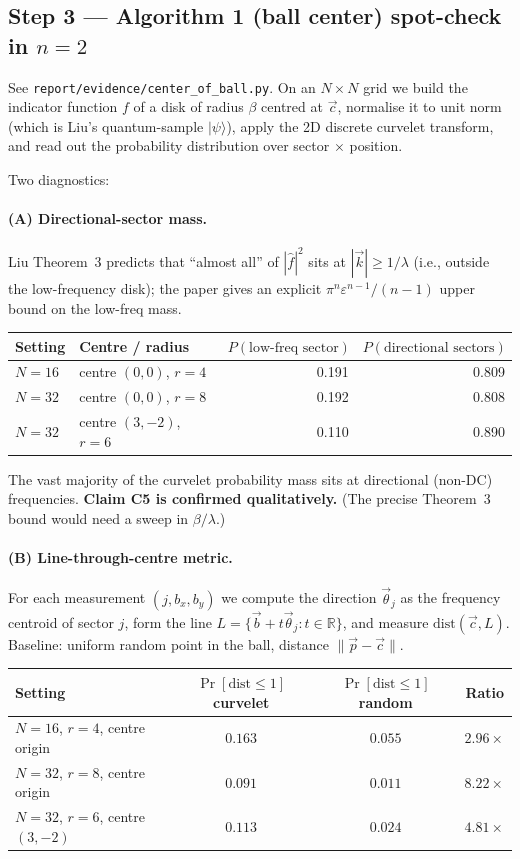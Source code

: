 \documentclass[11pt]{article}
\begin{document}
\subsection{Step 3 --- Algorithm 1 (ball center) spot-check in $n=2$}
See \texttt{report/evidence/center\_of\_ball.py}. On an $N \times N$ grid we build the indicator function $f$ of a disk of radius $\beta$ centred at $\vec c$, normalise it to unit norm (which is Liu's quantum-sample $|\psi\rangle$), apply the 2D discrete curvelet transform, and read out the probability distribution over sector $\times$ position.

Two diagnostics:
\paragraph{(A) Directional-sector mass.} Liu Theorem~3 predicts that ``almost all'' of $|\hat f|^2$ sits at $|\vec k| \geq 1/\lambda$ (i.e., outside the low-frequency disk); the paper gives an explicit $\pi^n \varepsilon^{n-1}/(n-1)$ upper bound on the low-freq mass.
\begin{center}
\begin{tabular}{llrr}
\toprule
Setting & Centre / radius & $P(\text{low-freq sector})$ & $P(\text{directional sectors})$ \\
\midrule
$N=16$ & centre $(0,0)$, $r=4$    & 0.191 & 0.809 \\
$N=32$ & centre $(0,0)$, $r=8$    & 0.192 & 0.808 \\
$N=32$ & centre $(3,-2)$, $r=6$   & 0.110 & 0.890 \\
\bottomrule
\end{tabular}
\end{center}
The vast majority of the curvelet probability mass sits at directional (non-DC) frequencies. \textbf{Claim C5 is confirmed qualitatively.} (The precise Theorem~3 bound would need a sweep in $\beta / \lambda$.)

\paragraph{(B) Line-through-centre metric.} For each measurement $(j, b_x, b_y)$ we compute the direction $\vec\theta_j$ as the frequency centroid of sector $j$, form the line $L = \{\vec b + t \vec\theta_j : t \in \mathbb{R}\}$, and measure $\text{dist}(\vec c, L)$. Baseline: uniform random point in the ball, distance $\|\vec p - \vec c\|$.

\begin{center}
\begin{tabular}{lccc}
\toprule
Setting & $\Pr[\text{dist} \leq 1]$ curvelet & $\Pr[\text{dist} \leq 1]$ random & Ratio \\
\midrule
$N=16$, $r=4$, centre origin & $0.163$ & $0.055$ & $2.96\times$ \\
$N=32$, $r=8$, centre origin & $0.091$ & $0.011$ & $8.22\times$ \\
$N=32$, $r=6$, centre $(3,-2)$ & $0.113$ & $0.024$ & $4.81\times$ \\
\bottomrule
\end{tabular}
\end{center}
\end{document}
